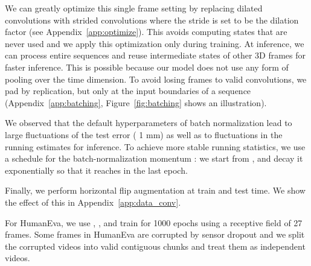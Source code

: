\documentclass[10pt,twocolumn,letterpaper]{article}
\begin{document}
We can greatly optimize this single frame setting by replacing dilated convolutions with strided convolutions where the stride is set to be the dilation factor (see Appendix~\ref{app:optimize}).
This avoids computing states that are never used and we apply this optimization only during training.
At inference, we can process entire sequences and reuse intermediate states of other 3D frames for faster inference. 
This is possible because our model does not use any form of pooling over the time dimension.
To avoid losing frames to valid convolutions, we pad by replication, but only at the input boundaries of a sequence (Appendix~\ref{app:batching}, Figure~\ref{fig:batching} shows an illustration). 

We observed that the default hyperparameters of batch normalization lead to large fluctuations of the test error ( 1 mm) as well as to fluctuations in the running estimates for inference. To achieve more stable running statistics, we use a schedule for the batch-normalization momentum : we start from , and decay it exponentially so that it reaches  in the last epoch.


Finally, we perform horizontal flip augmentation at train and test time. 
We show the effect of this in Appendix~\ref{app:data_conv}.

For HumanEva, we use , , and train for 1000 epochs using a receptive field of 27 frames. 
Some frames in HumanEva are corrupted by sensor dropout and we split the corrupted videos into valid contiguous chunks and treat them as independent videos.
\end{document}
